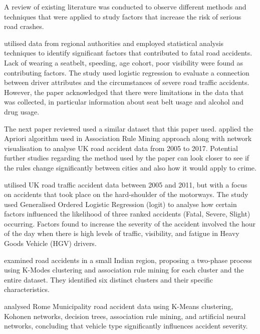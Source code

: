 A review of existing literature was conducted to observe different methods and techniques that were applied to study factors that increase the risk of serious road crashes.

 \cite{VALENT200271} utilised data from regional authorities and employed statistical analysis techniques to identify significant factors that contributed to fatal road accidents.
Lack of wearing a seatbelt, speeding, age cohort, poor visibility were found as contributing factors.
The study used logistic regression to evaluate a connection between driver attributes and the circumstances of severe road traffic accidents.
However, the paper acknowledged that there were limitations in the data that was collected, in particular information about seat belt usage and alcohol and drug usage.

The next paper reviewed used a similar dataset that this paper used.
 \cite{10.1007/978-3-030-39431-8_50} applied the Apriori algorithm used in Association Rule Mining approach along with network visualisation to analyse UK road accident data from 2005 to 2017.
Potential further studies regarding the method used by the paper can look closer to see if the rules change significantly between cities and also how it would apply to crime.


 \cite{MICHALAKI201589} utilised UK road traffic accident data between 2005 and 2011, but with a focus on accidents that took place on the hard-shoulder of the motorways.
The study used Generalised Ordered Logistic Regression (logit) to analyse how certain factors influenced the likelihood of three ranked accidents (Fatal, Severe, Slight) occurring.
Factors found to increase the severity of the accident involved the hour of the day when there is high levels of traffic, visibility, and fatigue in Heavy Goods Vehicle (HGV) drivers.



 \cite{kumar2015datamining} examined road accidents in a small Indian region, proposing a two-phase process using K-Modes clustering and association rule mining for each cluster and the entire dataset.
They identified six distinct clusters and their specific characteristics.

 \cite{COMI2022798} analysed Rome Municipality road accident data using K-Means clustering, Kohonen networks, decision trees, association rule mining, and artificial neural networks, concluding that vehicle type significantly influences accident severity.


